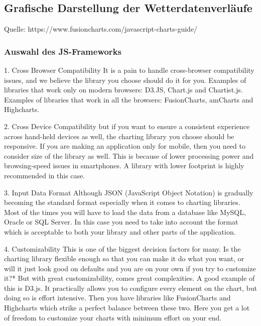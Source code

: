 \subsection{Grafische Darstellung der Wetterdatenverläufe}
\newline
{}\newline
{}\newline
{}\newline

Quelle: https://www.fusioncharts.com/javascript-charts-guide/

\subsubsection{Auswahl des JS-Frameworks}

1. Cross Browser Compatibility
It is a pain to handle cross-browser compatibility issues, and we believe the library you choose should do it for you.
Examples of libraries that work only on modern browsers: D3.JS, Chart.js and Chartist.js.
Examples of libraries that work in all the browsers: FusionCharts, amCharts and Highcharts.

2. Cross Device Compatibility
but if you want to ensure a consistent experience across hand-held devices as well, the charting library you choose should be responsive.
If you are making an application only for mobile, then you need to consider size of the library as well. This is because of lower processing power and browsing-speed issues in smartphones. A library with lower footprint is highly recommended in this case.

3. Input Data Format
Although JSON (JavaScript Object Notation) is gradually becoming the standard format especially when it comes to charting libraries. Most of the times you will have to load the data from a database like MySQL, Oracle or SQL Server. In this case you need to take into account the format which is acceptable to both your library and other parts of the application.

4. Customizability
This is one of the biggest decision factors for many. Is the charting library flexible enough so that you can make it do what you want, or will it just look good on defaults and you are on your own if you try to customize it?*
But with great customizability, comes great complexities. A good example of this is D3.js. It practically allows you to configure every element on the chart, but doing so is effort intensive. Then you have libraries like FusionCharts and Highcharts which strike a perfect balance between these two. Here you get a lot of freedom to customize your charts with minimum effort on your end.

